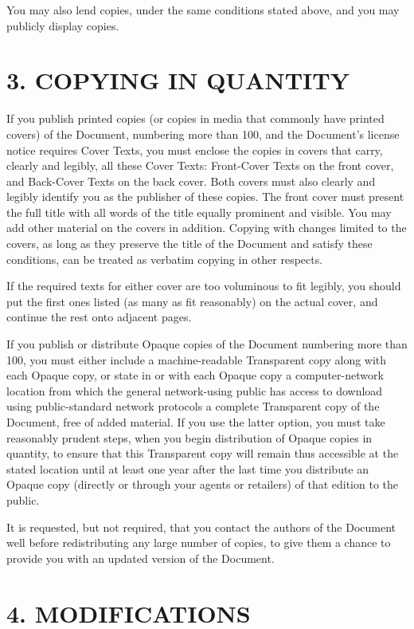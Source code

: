\documentclass[captions=tableheading]{scrbook}
\begin{document}
\begin{example}
You may also lend copies, under the same conditions stated above, and you may publicly display copies.
\section{3. COPYING IN QUANTITY}
\label{sec-18-4}


If you publish printed copies (or copies in media that commonly have printed covers) of the Document, numbering more than 100, and the Document's license notice requires Cover Texts, you must enclose the copies in covers that carry, clearly and legibly, all these Cover Texts: Front-Cover Texts on the front cover, and Back-Cover Texts on the back cover. Both covers must also clearly and legibly identify you as the publisher of these copies. The front cover must present the full title with all words of the title equally prominent and visible. You may add other material on the covers in addition. Copying with changes limited to the covers, as long as they preserve the title of the Document and satisfy these conditions, can be treated as verbatim copying in other respects.

If the required texts for either cover are too voluminous to fit legibly, you should put the first ones listed (as many as fit reasonably) on the actual cover, and continue the rest onto adjacent pages.

If you publish or distribute Opaque copies of the Document numbering more than 100, you must either include a machine-readable Transparent copy along with each Opaque copy, or state in or with each Opaque copy a computer-network location from which the general network-using public has access to download using public-standard network protocols a complete Transparent copy of the Document, free of added material. If you use the latter option, you must take reasonably prudent steps, when you begin distribution of Opaque copies in quantity, to ensure that this Transparent copy will remain thus accessible at the stated location until at least one year after the last time you distribute an Opaque copy (directly or through your agents or retailers) of that edition to the public.

It is requested, but not required, that you contact the authors of the Document well before redistributing any large number of copies, to give them a chance to provide you with an updated version of the Document.
\section{4. MODIFICATIONS}
\label{sec-18-5}



\end{example}
\end{document}
